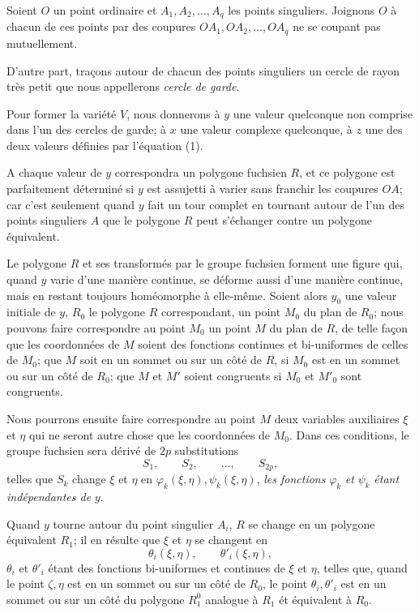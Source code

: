 \documentclass{article}
\begin{document}
Soient $O$ un point ordinaire et $A_{1}, A_{2}, \ldots, A_{q}$ les points singuliers. Joignons $O$ à chacun de ces points par des coupures $OA_{1}, OA_{2}, \ldots, OA_{q}$ ne se coupant pas mutuellement.

D'autre part, traçons autour de chacun des points singuliers un cercle de rayon très petit que nous appellerons \emph{cercle de garde}.

Pour former la variété $V$, nous donnerons à $y$ une valeur quelconque non comprise dans l'un des cercles de garde; à $x$ une valeur complexe quelconque, à $z$ une des deux valeurs définies par l'équation (1).

A chaque valeur de $y$ correspondra un polygone fuchsien $R$, et ce polygone est parfaitement déterminé si $y$ est assujetti à varier sans franchir les coupures $OA$; car c'est seulement quand $y$ fait un tour complet en tournant autour de l'un des points singuliers $A$ que le polygone $R$ peut s'échanger contre un polygone équivalent.

Le polygone $R$ et ses transformés par le groupe fuchsien forment une figure qui, quand $y$ varie d'une manière continue, se déforme aussi d'une manière continue, mais en restant toujours homéomorphe à elle-même. Soient alors $y_{0}$ une valeur initiale de $y$, $R_{0}$ le polygone $R$ correspondant, un point $M_{0}$ du plan de $R_{0}$; nous pouvons faire correspondre au point $M_{0}$ un point $M$ du plan
de $R$, de telle façon que les coordonnées de $M$ soient des fonctions continues et bi-uniformes de celles de $M_{0}$; que $M$ soit en un sommet ou sur un côté de $R$, si $M_{0}$ est en un sommet ou sur un côté de $R_{0}$; que $M$ et $M'$ soient congruents si $M_{0}$ et $M'_{0}$ sont congruents.

Nous pourrons ensuite faire correspondre au point $M$ deux variables auxiliaires $\xi$ et $\eta$ qui ne seront autre chose que les coordonnées de $M_{0}$. Dans ces conditions, le groupe fuchsien sera dérivé de $2p$ substitutions
\[ S_{1}, \qquad S_{2}, \qquad \ldots, \qquad S_{2p}, \]
telles que $S_{k}$ change $\xi$ et $\eta$ en $\varphi_{k}(\xi, \eta), \psi_{k}(\xi, \eta)$, \emph{les fonctions} $\varphi_{k}$ \emph{et} $\psi_{k}$ \emph{étant indépendantes de} $y$.

Quand $y$ tourne autour du point singulier $A_{i}$, $R$ se change en un polygone équivalent $R_{1}$; il en résulte que $\xi$ et $\eta$ se changent en
\[ \theta_{i}(\xi, \eta), \qquad \theta'_{i}(\xi, \eta), \]
$\theta_{i}$ et $\theta'_{i}$ étant des fonctions bi-uniformes et continues de $\xi$ et $\eta$, telles que, quand le point $\zeta, \eta$ est en un sommet ou sur un côté de $R_{0}$, le point $\theta_{i}, \theta'_{i}$ est en un sommet ou sur un côté du polygone $R^{0}_{1}$ analogue à $R_{1}$ ét équivalent à $R_{0}$.
\end{document}
